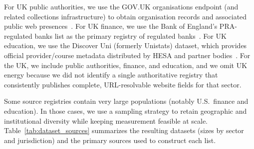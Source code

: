 \documentclass[a4paper,fleqn]{cas-sc}
\begin{document}
    For UK public authorities, we use the GOV.UK organisations endpoint (and related collections infrastructure) to obtain organisation records and associated public web presences~\cite{uk-gov-collections-api,uk-gov-collections-api-docs}.
    For UK finance, we use the Bank of England’s PRA-regulated banks list as the primary registry of regulated banks~\cite{uk-pra-creditunions-list}.
    For UK education, we use the Discover Uni (formerly Unistats) dataset, which provides official provider/course metadata distributed by HESA and partner bodies~\cite{hesa_discoveruni_2024}.
    For the UK, we include public authorities, finance, and education, and we omit UK energy because we did not identify a single authoritative registry that consistently publishes complete, URL-resolvable website fields for that sector.

    Some source registries contain very large populations (notably U.S.\ finance and education).
    In those cases, we use a sampling strategy to retain geographic and institutional diversity while keeping measurement feasible at scale.
    Table~\ref{tab:dataset_sources} summarizes the resulting datasets (sizes by sector and jurisdiction) and the primary sources used to construct each list.
\end{document}
